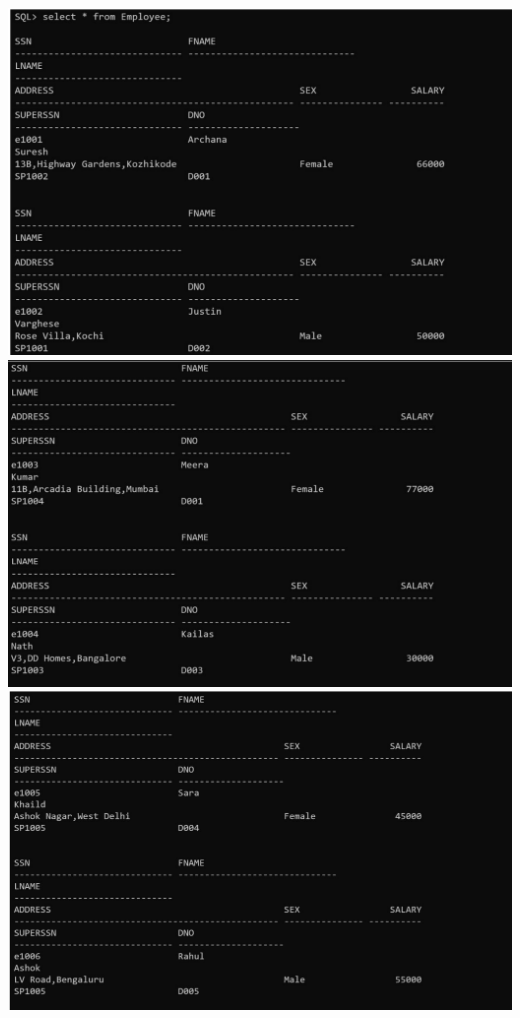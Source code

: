 \documentclass[a4paper,12pt]{report}
\begin{document}
\includegraphics[scale=0.8]{CURSOR2.3.png}
\includegraphics[scale=0.8]{CURSOR2.4.png}
\includegraphics[scale=0.8]{CURSOR2.5.png}
\end{document}
